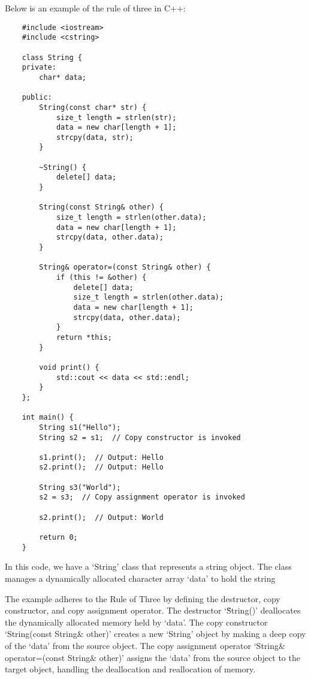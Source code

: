 \begin{solution}
    Below is an example of the rule of three in C++:
    
    \horizontalline
    
    \begin{verbatim}   
    #include <iostream>
    #include <cstring>
    
    class String {
    private:
        char* data;
    
    public:
        String(const char* str) {
            size_t length = strlen(str);
            data = new char[length + 1];
            strcpy(data, str);
        }
    
        ~String() {
            delete[] data;
        }
    
        String(const String& other) {
            size_t length = strlen(other.data);
            data = new char[length + 1];
            strcpy(data, other.data);
        }
    
        String& operator=(const String& other) {
            if (this != &other) {
                delete[] data;
                size_t length = strlen(other.data);
                data = new char[length + 1];
                strcpy(data, other.data);
            }
            return *this;
        }
    
        void print() {
            std::cout << data << std::endl;
        }
    };
    
    int main() {
        String s1("Hello");
        String s2 = s1;  // Copy constructor is invoked
    
        s1.print();  // Output: Hello
        s2.print();  // Output: Hello
    
        String s3("World");
        s2 = s3;  // Copy assignment operator is invoked
    
        s2.print();  // Output: World
    
        return 0;
    }
        \end{verbatim}
    
    \horizontalline

    In this code, we have a `String' class that represents a string object. The class manages a dynamically allocated character array `data' to hold the string
    
    The example adheres to the Rule of Three by defining the destructor, copy constructor, and copy assignment operator. The destructor `\~String()' deallocates the dynamically allocated memory held by `data'. The copy constructor `String(const String\& other)' creates a new `String' object 
    by making a deep copy of the `data' from the source object. The copy assignment operator `String\& operator=(const String\& other)' assigns the `data' from the source object to the target object, handling the deallocation and reallocation of memory.
    

\end{solution}
